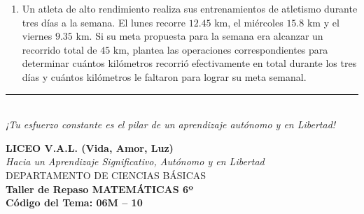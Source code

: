 \documentclass[12pt, letterpaper]{article}
\begin{document}
\begin{enumerate}[itemsep=0.8cm]
		A partir de la información de la tabla, responde:
		\begin{enumerate}[label=\alph*., itemsep=0.2cm, topsep=0.2cm]
			\item Si un comprador adquiere $2.5\text{ kg}$ de Manzana Roja, ¿cuánto dinero exacto debe pagar por esta fruta?
			\item Si otra persona compra $1.5\text{ kg}$ de Uva Isabela y $3\text{ kg}$ de Pera Importada, ¿cuál es el costo total de su compra?
		\end{enumerate}
		
		\item Un atleta de alto rendimiento realiza sus entrenamientos de atletismo durante tres días a la semana. El lunes recorre $12.45\text{ km}$, el miércoles $15.8\text{ km}$ y el viernes $9.35\text{ km}$. Si su meta propuesta para la semana era alcanzar un recorrido total de $45\text{ km}$, plantea las operaciones correspondientes para determinar cuántos kilómetros recorrió efectivamente en total durante los tres días y cuántos kilómetros le faltaron para lograr su meta semanal.
		
	\end{enumerate}
	
	\vfill
	\begin{center}
		\rule{0.5\textwidth}{0.4pt} \\
		\vspace{0.2cm}
		\textit{¡Tu esfuerzo constante es el pilar de un aprendizaje autónomo y en Libertad!}
	\end{center}
	
	\newpage
	\begin{center}
		{\Large \textbf{LICEO V.A.L. (Vida, Amor, Luz)}}\\[0.1cm]
		{\normalsize \textit{Hacia un Aprendizaje Significativo, Autónomo y en Libertad}}\\[0.2cm]
		{\large DEPARTAMENTO DE CIENCIAS BÁSICAS}\\[0.1cm]
		\textbf{Taller de Repaso MATEMÁTICAS 6º}\\[0.1cm]
		\textbf{Código del Tema: 06M – 10}\\[0.1cm]
	\end{center}
	
\end{document}
